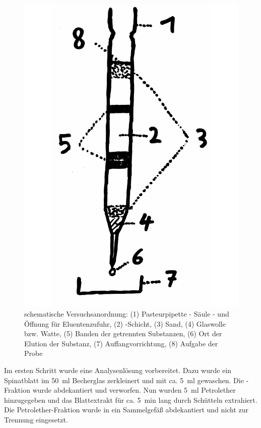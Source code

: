 \documentclass{article}
\begin{document}
        \begin{figure}[H]
          \includegraphics[scale=0.08, center]{Graphiken/Versuchsanordnungen/VersuchsanordnungSC.png} 
          \caption[schematische Versuchsanordnung Säulenchromatographie, Quelle: Autor]{schematische Versuchsanordnung: (1) Pasteurpipette - Säule - und Öffnung für Eluentenzufuhr, (2) -Schicht, (3) Sand, (4) Glaswolle bzw. Watte, (5) Banden der getrennten Substanzen, (6) Ort der Elution der Substanz, (7) Auffangvorrichtung, (8) Aufgabe der Probe}
          \label{fig:Versuchsanordnungzwei}
        \end{figure}
        
        Im ersten Schritt wurde eine Analysenlösung vorbereitet. Dazu wurde ein Spinatblatt im \SI[mode=text,separate-uncertainty=true]{50}{\milli\litre} Becherglas zerkleinert und mit ca. \SI[mode=text]{5}{\milli\litre}  gewaschen. Die -Fraktion wurde abdekantiert und verworfen. Nun wurden \SI[mode=text]{5}{\milli\litre} Petrolether hinzugegeben und das Blattextrakt für ca. \SI[mode=text]{5}{\minute} lang durch Schütteln extrahiert. Die Petrolether-Fraktion wurde in ein Sammelgefäß abdekantiert und nicht zur Trennung eingesetzt. 
        
\end{document}
